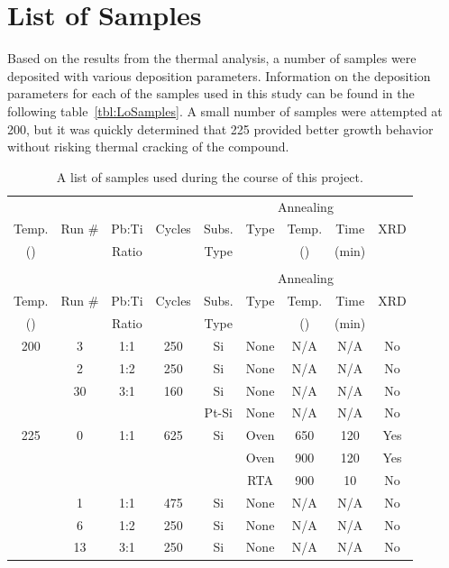 \section{List of Samples}
\label{chap:Results-Samples}

Based on the results from the thermal analysis, a number of samples were deposited with various deposition parameters. Information on the deposition parameters for each of the samples used in this study can be found in the following table~\vref{tbl:LoSamples}. A small number of samples were attempted at 200\degC{}, but it was quickly determined that 225\degC{} provided better growth behavior without risking thermal cracking of the compound. 

{\small
\begin{longtable}{ccccccccc}
	\caption[List of Samples]{A list of samples produced during the course of this project.%
	\label{tbl:LoSamples}}\\
	\toprule
	&&&&&\multicolumn{3}{c}{Annealing}&\\ \cmidrule{6-8}
	Temp.		&Run \#	&Pb:Ti	 	&Cycles 	&Subs. 	&Type	&Temp. 		&Time &XRD\\ 
	(\degC{})		&		&Ratio		&		&Type	&		&(\degC{})	&(min) &\\ \midrule%
	\endfirsthead
	\caption[]{A list of samples used during the course of this project.}\\
	\toprule
	&&&&&\multicolumn{3}{c}{Annealing}&\\ \cmidrule{6-8}
	Temp.		&Run \#	&Pb:Ti	 	&Cycles 	&Subs. 	&Type	&Temp. 		&Time &XRD\\ 
	(\degC{})		&		&Ratio		&		&Type	&		&(\degC{})	&(min) &\\ \midrule%
	\endhead
	200	&3		&1:1		&250	&Si		&None	&N/A		&N/A		&No\\
		&2		&1:2		&250	&Si		&None	&N/A		&N/A		&No\\
		&30		&3:1		&160	&Si		&None	&N/A		&N/A		&No\\
		&		&		&		&Pt-Si	&None	&N/A		&N/A		&No\\ \midrule
	225	&0		&1:1		&625	&Si		&Oven	&650	&120	&Yes\\
		&		&		&		&		&Oven	&900	&120	&Yes\\
		&		&		&		&		&RTA	&900	&10		&No\\
		&1		&1:1		&475	&Si		&None	&N/A		&N/A		&No\\
		&6		&1:2		&250	&Si		&None 	&N/A		&N/A		&No\\
		&13		&3:1		&250	&Si		&None 	&N/A		&N/A		&No\\

\end{longtable}}
